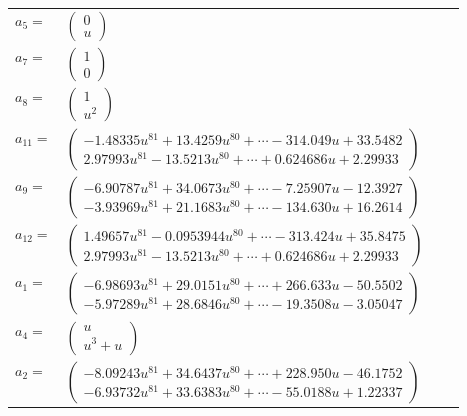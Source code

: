 \documentclass[1p]{elsarticle_modified}
\theoremstyle{definition}
\begin{document}
\begin{tabular}{m{7pt} m{180pt} m{7pt} m{180pt} }
\flushright $a_{5}=$&$\begin{pmatrix}0\\u\end{pmatrix}$ \\
\flushright $a_{7}=$&$\begin{pmatrix}1\\0\end{pmatrix}$ \\
\flushright $a_{8}=$&$\begin{pmatrix}1\\u^2\end{pmatrix}$ \\
\flushright $a_{11}=$&$\begin{pmatrix}-1.48335 u^{81}+13.4259 u^{80}+\cdots-314.049 u+33.5482\\2.97993 u^{81}-13.5213 u^{80}+\cdots+0.624686 u+2.29933\end{pmatrix}$ \\
\flushright $a_{9}=$&$\begin{pmatrix}-6.90787 u^{81}+34.0673 u^{80}+\cdots-7.25907 u-12.3927\\-3.93969 u^{81}+21.1683 u^{80}+\cdots-134.630 u+16.2614\end{pmatrix}$ \\
\flushright $a_{12}=$&$\begin{pmatrix}1.49657 u^{81}-0.0953944 u^{80}+\cdots-313.424 u+35.8475\\2.97993 u^{81}-13.5213 u^{80}+\cdots+0.624686 u+2.29933\end{pmatrix}$ \\
\flushright $a_{1}=$&$\begin{pmatrix}-6.98693 u^{81}+29.0151 u^{80}+\cdots+266.633 u-50.5502\\-5.97289 u^{81}+28.6846 u^{80}+\cdots-19.3508 u-3.05047\end{pmatrix}$ \\
\flushright $a_{4}=$&$\begin{pmatrix}u\\u^3+u\end{pmatrix}$ \\
\flushright $a_{2}=$&$\begin{pmatrix}-8.09243 u^{81}+34.6437 u^{80}+\cdots+228.950 u-46.1752\\-6.93732 u^{81}+33.6383 u^{80}+\cdots-55.0188 u+1.22337\end{pmatrix}$ \\

\end{tabular}
\end{document}
